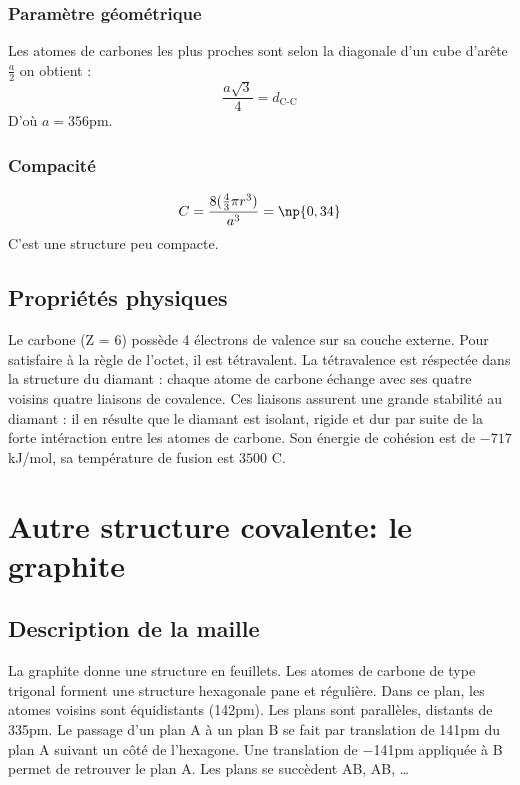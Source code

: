\subsubsection{Paramètre géométrique}
Les atomes de carbones les plus proches sont selon la diagonale d’un cube d’arête
$\frac{a}{2}$ on obtient :
\begin{equation}
    \frac{a\sqrt{3}}{4} = d_\text{C-C}
\end{equation}
D'où $a = 356$pm.

\subsubsection{Compacité} 
\begin{equation}
    C = \frac{8(\frac{4}{3}\pi r^3)}{a^3} = \np{0,34}
\end{equation}
C'est une structure peu compacte.


\subsection{Propriétés physiques}
Le carbone (Z = 6) possède 4 électrons de valence sur sa couche externe. Pour
satisfaire à la règle de l’octet, il est tétravalent. La tétravalence est réspectée dans la structure
du diamant : chaque atome de carbone échange avec ses quatre voisins quatre liaisons
de covalence. Ces liaisons assurent une grande stabilité au diamant : il en résulte que
le diamant est isolant, rigide et dur par suite de la forte intéraction entre les atomes de
carbone.
Son énergie  de cohésion est de $-717$kJ/mol, sa température  de fusion est $3500$
\degre C.


\section{Autre structure covalente: le graphite}
\subsection{Description de la maille}
La graphite donne une structure en feuillets. Les atomes de carbone de type trigonal
forment une structure hexagonale pane et régulière. Dans ce plan, les atomes voisins
sont équidistants (142pm). Les plans sont parallèles, distants de 335pm. Le passage
d’un plan A à un plan B se fait par translation de 141pm du plan A suivant un côté de
l’hexagone. Une translation de $-$141pm appliquée à B permet de retrouver le plan A.
Les plans se succèdent AB, AB, \dots


